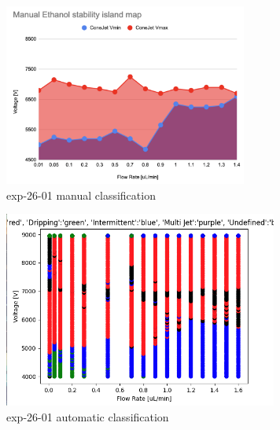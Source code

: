    \begin{multicols}{2}


        \begin{figure}[H]
            \center
            \includegraphics[width=8cm]{Figuras/april/manual_stability.png}
            \caption{ exp-26-01 manual classification}
            \label{fig:stability_2}
        \end{figure}

        \begin{figure}[H]
            \center
            \includegraphics[width=9cm]{Figuras/report3/map-exp-26-01.png}
            \caption{ exp-26-01 automatic classification}
            \label{fig:stability_3}
        \end{figure}

    \end{multicols}

